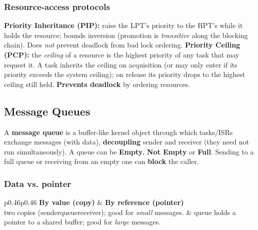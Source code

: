 \subsubsection{Resource-access protocols}
\begin{outline}
  \1 \textbf{Priority Inheritance (PIP):} raise the LPT's priority to the HPT's while it holds the resource; bounds inversion (promotion is \emph{transitive} along the blocking chain). Does \emph{not} prevent deadlock from bad lock ordering.
  \1 \textbf{Priority Ceiling (PCP):} the \emph{ceiling} of a resource is the highest priority of any task that may request it. A task inherits the ceiling on acquisition (or may only enter if its priority exceeds the system ceiling); on release its priority drops to the highest ceiling still held. \textbf{Prevents deadlock} by ordering resources.
\end{outline}



\subsection{Message Queues}

A \textbf{message queue} is a buffer-like kernel object through which tasks/ISRs exchange messages (with data), \textbf{decoupling} sender and receiver (they need not run simultaneously).
A queue can be \textbf{Empty}, \textbf{Not Empty} or \textbf{Full}. 
Sending to a full queue or receiving from an empty one can \textbf{block} the caller.
\subsubsection{Data vs. pointer}

\vspace{-0.2cm}
\begin{ctabular}{p{0.46\linewidth}p{0.46\linewidth}}
\textbf{By value (copy)} & \textbf{By reference (pointer)} \\ \hline
two copies (sender\textrightarrow{}queue\textrightarrow{}receiver); good for \emph{small} messages. & queue holds a pointer to a shared buffer; good for \emph{large} messages. \\
\end{ctabular}

